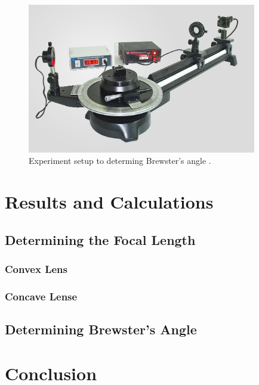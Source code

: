 \documentclass[12pt]{article}
\begin{document}
\begin{figure}[H]
    \centering
    \includegraphics[width=10cm]{brewster exp.png}
    \caption{\centering Experiment setup to determing Brewster's angle \protect\cite{holmarcexp}.}
    \label{fig:brewexp}
\end{figure}

\section{Results and Calculations} \label{sec:3}

\subsection{Determining the Focal Length} \label{sec:3.1}

\subsubsection{Convex Lens} \label{sec:3.1.1}



\subsubsection{Concave Lense} \label{sec:3.1.2}



\subsection{Determining Brewster's Angle} \label{sec:3.2}



\section{Conclusion} \label{sec:4}
\end{document}
